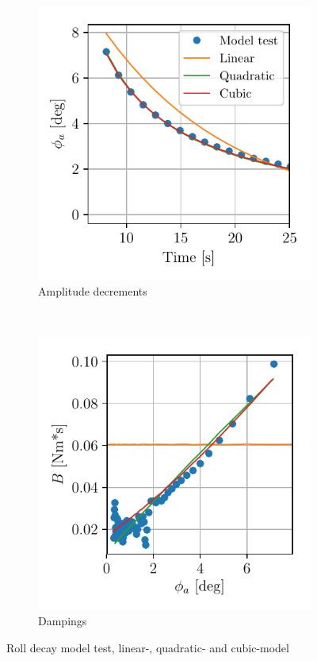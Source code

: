 \begin{figure}[H]
    \begin{subfigure}[b]{0.45\textwidth}
        \centering
        \includegraphics[]{kappa/images/roll_decay_amplitude.pdf}
        \caption{Amplitude decrements}
        \label{fig:roll_decay_amplitude}
    \end{subfigure}
        ~ %
    \begin{subfigure}[b]{0.45\textwidth}
        \centering
        \includegraphics[]{kappa/images//roll_decay_damping.pdf}
        \caption{Dampings}
        \label{fig:roll_decay_damping}
    \end{subfigure}
    \caption{Roll decay model test, linear-, quadratic- and cubic-model}
    \label{fig:roll_decay}
\end{figure}


